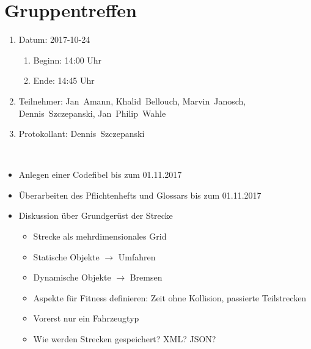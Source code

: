 \pagebreak
\section[Gruppentreffen - 2017-10-24]{Gruppentreffen}

\begin{enumerate}
	\item Datum: 2017-10-24
	\begin{enumerate}[label*=\arabic*.]
		\item Beginn: 14:00 Uhr
		\item Ende: 14:45 Uhr
	\end{enumerate}
	
	\item Teilnehmer:
	\subitem Jan~Amann, Khalid~Bellouch, Marvin~Janosch, Dennis~Szczepanski, Jan~Philip~Wahle
	
	\item Protokollant: Dennis~Szczepanski
\end{enumerate}
\ \\

\begin{itemize}
	\item Anlegen einer Codefibel bis zum 01.11.2017
	\item Überarbeiten des Pflichtenhefts und Glossars bis zum 01.11.2017
	\item Diskussion über Grundgerüst der Strecke
	\begin{itemize}
		\item Strecke als mehrdimensionales Grid
		\item Statische Objekte $\rightarrow$ Umfahren
		\item Dynamische Objekte $\rightarrow$ Bremsen
		\item Aspekte für Fitness definieren: Zeit ohne Kollision, passierte Teilstrecken
		\item Vorerst nur ein Fahrzeugtyp
		\item Wie werden Strecken gespeichert? XML? JSON?
	\end{itemize}
\end{itemize}